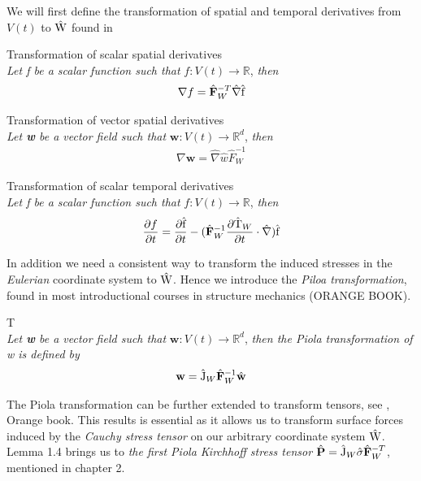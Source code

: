 We will first define the transformation of spatial and temporal derivatives from $V(t)$ to $\text{\^{W}}$ found in \cite{Richter2016}\\

\begin{lem}
Transformation of scalar spatial derivatives \\
\textit{Let f be a scalar function such that} $f: V(t) \rightarrow \mathbb{R}$, \textit{then} 
\begin{align}
\nabla f = \hat{F}_W^{-T} \hat{\nabla}\ha{f}
\end{align} 
\end{lem}

\begin{lem}
Transformation of vector spatial derivatives \\
\textit{Let \textbf{w} be a vector field such that} $\mathbf{w}: V(t) \rightarrow \mathbb{R}^d$, \textit{then} 
\begin{align}
\nabla \mathbf{w} = \hat{\nabla}\hat{w} \hat{F}_W^{-1} 
\end{align} 
\end{lem}

\begin{lem}
Transformation of scalar temporal derivatives \\
\textit{Let f be a scalar function such that} $f: V(t) \rightarrow \mathbb{R}$, \textit{then} 
\begin{align}
\pder{f}{t} = \pder{\ha{f} }{t} - (\hat{F}_W^{-1} \pder{\ha{T}_W}{t} \cdot \hat{\nabla}) \ha{f}
\end{align} 
\end{lem}

In addition we need a consistent way to transform the induced stresses in the \textit{Eulerian} coordinate system to $\text{\^{W}}$. Hence we introduce the \textit{Piloa transformation}, found in most introductional courses in structure mechanics (ORANGE BOOK).
\\
\begin{lem}
T \\
\textit{Let \textbf{w} be a vector field such that} $\mathbf{w}: V(t) \rightarrow \mathbb{R}^d$, \textit{then the Piola transformation of w is defined by} 
\begin{align}
\mathbf{w} = \ha{J}_W \hat{F}^{-1}_W \hat{w}
\end{align} 
\end{lem}

The Piola transformation can be further extended to transform tensors, see \cite{Richter2016}, Orange book. This results is essential as it allows us to transform surface forces induced by the \textit{Cauchy stress tensor} on our arbitrary coordinate system $\text{\^{W}}$. Lemma 1.4 brings us to \textit{the first Piola Kirchhoff stress tensor} $\hat{P} = \ha{J}_W \hat{\sigma}\hat{F}_W^{-T}$, mentioned in chapter 2. 

